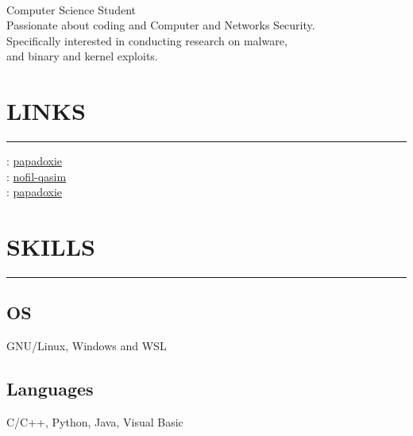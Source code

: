 \documentclass[]{resume}
\begin{document}
%
%

\begin{large}
    \\
\end{large}

\vspace{4pt}
\noindent Computer Science Student\\
Passionate about coding and Computer and Networks Security.\\
Specifically interested in conducting research on malware,\\
and binary and kernel exploits.


%
%

\section{LINKS}
\noindent\rule{5 cm}{0.4pt}

\noindent {}: \href{https://github.com/papadoxie}{papadoxie}\\
: \href{https://linkedin.com/in/nofil-qasim}{nofil-qasim}\\
: \href{https://stackoverflow.com/users/8430623/papadoxie}{papadoxie}\\

%
%

\section{SKILLS}
\noindent\rule{5 cm}{0.4pt}

\subsection{OS}
\noindent GNU/Linux, Windows and WSL

\vspace{6pt}
\subsection{Languages}
\noindent C/C++, Python, Java, Visual Basic

\vspace{6pt}
\end{document}
